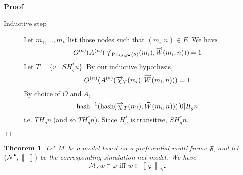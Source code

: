 \documentclass{article}
\newcommand{\infixiff}{\text{ iff }}
\newcommand{\tmop}[1]{\ensuremath{\operatorname{#1}}}
\newenvironment{proof}{\noindent\textbf{Proof\ }}{\hspace*{\fill}$\Box$\medskip}
\newtheorem{theorem}{Theorem}
\providecommand{\infixiff}{\mathbin{\text{ iff }}}
\newcommand{\Net}{\ensuremath{\mathcal{N}}}
\newcommand{\semantics}[1]{\left\llbracket #1 \right\rrbracket}
\newcommand{\bigchi}{\Large{\chi}}
\newcommand{\hash}{\textsf{\tmop{hash}}}
\newcommand{\Prop}{\textsf{\tmop{Prop}}}
\begin{document}
\begin{proof}
\begin{description}
    \item[Inductive step] Let $m_1, \ldots, m_k$ list those nodes such that
    $(m_i, n) \in E$. We have
    \[ O^{(n)} (A^{(n)}
       (\smash{\overrightarrow{\bigchi}}_{\Prop_{\Net^{\bullet}} (S)} (m_i),
       \smash{\overrightarrow{W}} (m_i, n))) = 1 \]
    Let $T = \{ u \mid S H_g^{\ast} u \}$. By our inductive hypothesis,
    \[ O^{(n)} (A^{(n)} (\smash{\overrightarrow{\bigchi}}_T (m_i),
       \smash{\overrightarrow{W}} (m_i, n))) = 1 \]
    By choice of $O$ and $A$,
    \[ \hash^{- 1} (\hash (\smash{\overrightarrow{\bigchi}}_T (m_i),
       \smash{\vec{W}} (m_i, n))) [0] H_g n \]
    i.e. $T H_g n$ (and so $T H^{\ast}_g n$). Since $H^{\ast}_g$ is
    transitive, $S H^{\ast}_g n$.
  \end{description}
  
\end{proof}

\begin{theorem}
  Let $\mathcal{M}$ be a model based on a preferential multi-frame
  $\mathfrak{F}$, and let $\langle \Net^{\bullet}, \semantics{\cdot} \rangle$
  be the corresponding simulation net model. We have
  \[ \mathcal{M}, w \models \varphi \infixiff w \in
     \semantics{\varphi}_{\Net^{\bullet}} \]
\end{theorem}
\end{document}

